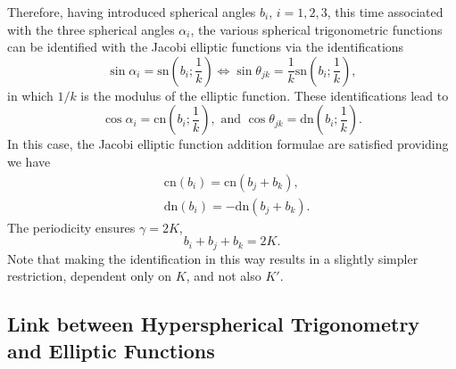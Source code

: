 \documentclass[fleqn,11pt,twoside]{article}
\theoremstyle{definition}
\begin{document}
Therefore, having introduced spherical angles $b_i$, $i=1,2,3$, this time associated with the three spherical angles $\alpha_i$, the various spherical trigonometric functions can be identified with the Jacobi elliptic functions via the identifications
\begin{equation}
\sin\alpha_i=\mathrm{sn}\left(b_i;\frac{1}{k}\right)\iff\sin\theta_{jk}=\frac{1}{k}\mathrm{sn}\left(b_i;\frac{1}{k}\right),
\end{equation}
in which $1/k$ is the modulus of the elliptic function. These identifications lead to
\begin{equation}
\cos\alpha_i=\mathrm{cn}\left(b_i;\frac{1}{k}\right),\,\,\mathrm{and}\,\,\cos\theta_{jk}=\mathrm{dn}\left(b_i;\frac{1}{k}\right).
\end{equation}
In this case, the Jacobi elliptic function addition formulae are satisfied providing we have
\begin{equation}
\begin{split}
&\mathrm{cn}(b_i)=\mathrm{cn}(b_j+b_k),\\
&\mathrm{dn}(b_i)=-\mathrm{dn}(b_j+b_k).
\end{split}
\end{equation}
The periodicity ensures $\gamma=2K$,
\begin{equation}
b_i+b_j+b_k=2K.
\end{equation}
Note that making the identification in this way results in a slightly simpler restriction, dependent only on $K$, and not also $K'$.

\subsection{Link between Hyperspherical Trigonometry and Elliptic Functions}
\end{document}
